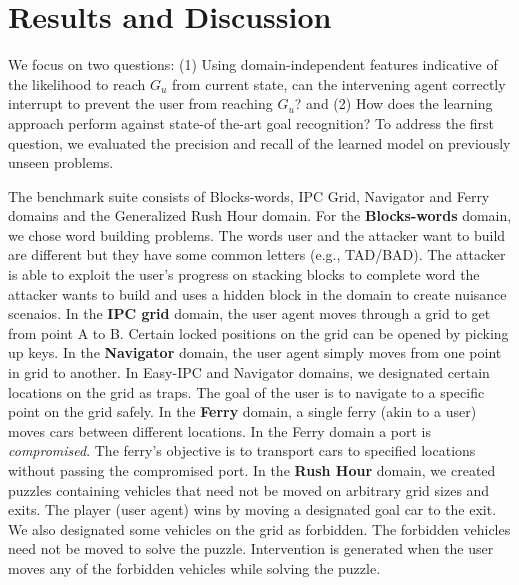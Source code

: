 \documentclass[letterpaper]{article}
\theoremstyle{plain}
\begin{document}
\section{Results and Discussion}
We focus on two questions: (1) Using domain-independent features indicative of the likelihood to reach $G_u$ from current state, can the intervening agent correctly interrupt to prevent the user from reaching $G_u$? and (2) How does the learning approach perform against state-of the-art goal recognition? To address the first question, we evaluated the precision and recall of the learned model on previously unseen problems.

The benchmark suite consists of Blocks-words, IPC Grid, Navigator and Ferry domains and the Generalized Rush Hour domain. For the \textbf{Blocks-words} domain, we chose word building problems. The words user and the attacker want to build are different but they have some common letters (e.g., TAD/BAD). The attacker is able to exploit the user's progress on stacking blocks to complete word the attacker wants to build and uses a hidden block in the domain to create nuisance scenaios. In the \textbf{IPC grid} domain, the user agent moves through a grid to get from point A to B. Certain locked positions on the grid can be opened by picking up keys. In the \textbf{Navigator} domain, the user agent simply moves from one point in grid to another. In Easy-IPC and Navigator domains, we designated certain locations on the grid as traps. The goal of the user is to navigate to a specific point on the grid safely. In the \textbf{Ferry} domain, a single ferry (akin to a user) moves cars between different locations. In the Ferry domain a port is \emph{compromised}. The ferry's objective is to transport cars to specified locations without passing the compromised port. In the \textbf{Rush Hour} domain, we created puzzles containing vehicles that need not be moved on arbitrary grid sizes and exits. The player (user agent) wins by moving a designated goal car to the exit. We also designated some vehicles on the grid as forbidden. The forbidden vehicles need not be moved to solve the puzzle. Intervention is generated when the user moves any of the forbidden vehicles while solving the puzzle.
\end{document}

